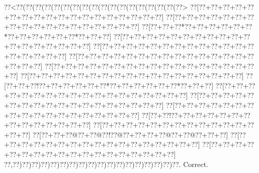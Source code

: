 \documentclass[a5paper]{article}
\begin{document}
\begin{center}
{\goo
\0??<\0??(\0??(\0??(\0??(\0??(\0??(\0??(\0??(\0??(\0??(\0??(\0??(\0??(\0??(\0??(\0??(\0??(\0??>
\0??[\0??+\0??+\0??+\0??+\0??+\0??+\0??+\0??+\0??+\0??+\0??+\0??+\0??+\0??+\0??+\0??+\0??+\0??]
\0??[\0??+\0??+\0??+\0??+\0??+\0??+\0??+\0??+\0??+\0??+\0??+\0??+\0??+\0??+\0??+\0??+\0??+\0??]
\0??[\0??+\0??+\0??*\0??+\0??+\0??+\0??+\0??+\0??*\0??+\0??+\0??+\0??+\0??+\0??*\0??+\0??+\0??]
\0??[\0??+\0??+\0??+\0??+\0??+\0??+\0??+\0??+\0??+\0??+\0??+\0??+\0??+\0??+\0??+\0??+\0??+\0??]
\0??[\0??+\0??+\0??+\0??+\0??+\0??+\0??+\0??+\0??+\0??+\0??+\0??+\0??+\0??+\0??+\0??+\0??+\0??]
\0??[\0??+\0??+\0??+\0??+\0??+\0??+\0??+\0??+\0??+\0??+\0??+\0??+\0??+\0??+\0??+\0??+\0??+\0??]
\0??[\0??+\0??+\0??+\0??+\0??+\0??+\0??+\0??+\0??+\0??+\0??+\0??+\0??+\0??+\0??+\0??+\0??+\0??]
\0??[\0??+\0??+\0??+\0??+\0??+\0??+\0??+\0??+\0??+\0??+\0??+\0??+\0??+\0??+\0??+\0??+\0??+\0??]
\0??[\0??+\0??+\0??!\0??+\0??+\0??+\0??+\0??+\0??*\0??+\0??+\0??+\0??+\0??+\0??*\0??+\0??+\0??]
\0??[\0??+\0??+\0??+\0??+\0??+\0??+\0??+\0??+\0??+\0??+\0??+\0??+\0??+\0??+\0??+\0??+\0??+\0??]
\0??[\0??+\0??+\0??+\0??+\0??+\0??+\0??+\0??+\0??+\0??+\0??+\0??+\0??+\0??+\0??+\0??+\0??+\0??]
\0??[\0??+\0??+\0??+\0??+\0??+\0??+\0??+\0??+\0??+\0??+\0??+\0??+\0??+\0??+\0??+\0??+\0??+\0??]
\0??[\0??+\0??!\0??+\0??+\0??+\0??+\0??+\0??+\0??+\0??+\0??+\0??+\0??+\0??+\0??+\0??]
\0??[\0??+\0??+\0??+\0??+\0??+\0??+\0??+\0??+\0??+\0??+\0??+\0??+\0??+\0??+\0??]
\0??[\0??+\0??+\0??@\0??+\0??@\0??!\0??@\0??+\0??+\0??+\0??@\0??+\0??@\0??+\0??+\0??]
\0??[\0??+\0??+\0??+\0??+\0??+\0??+\0??+\0??+\0??+\0??+\0??+\0??+\0??+\0??+\0??+\0??+\0??]
\0??[\0??+\0??+\0??+\0??+\0??+\0??+\0??+\0??+\0??+\0??+\0??+\0??+\0??+\0??+\0??+\0??+\0??+\0??]
\0??,\0??)\0??)\0??)\0??)\0??)\0??)\0??)\0??)\0??)\0??)\0??)\0??)\0??)\0??)\0??)\0??)\0??)\0??.
}
Correct. 

\end{center}
\end{document}
